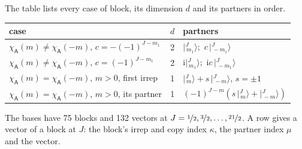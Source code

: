 \documentclass[10pt,a4paper]{article}
\numberwithin{equation}{section}
\newcommand{\grp}[1]{\mathsf{#1}}
\newcommand{\iunit}{\mathrm{i}}
\newcommand{\chiA}{\chi_{\grp{A}}}
\newcommand{\mult}{\kappa}
\newcommand{\intx}{\mu}
\newcommand{\jm}[2]{\bigl\lvert{}^{#1}_{\,#2}\bigr\rangle}
\begin{document}
\leavevmode\label{n:head.case}\label{n:head.partners}The table lists every case of block, its dimension $d$ and its partners in order.
\begin{center}\begin{tabular}{@{}lrl@{}}\toprule
case & $d$ & partners\\\midrule
$\chiA(m) \ne \chiA(-m)$, $c = -(-1)^{J-m_1}$ & 2 & $\jm{J}{m_1}$;\ $c\,\jm{J}{-m_1}$\\
$\chiA(m) \ne \chiA(-m)$, $c = (-1)^{J-m_1}$ & 2 & $\iunit\jm{J}{m_1}$;\ $\iunit c\,\jm{J}{-m_1}$\\
$\chiA(m) = \chiA(-m)$, $m > 0$, first irrep & 1 & $\jm{J}{m} + s\,\jm{J}{-m}$, $s = \pm1$\\
$\chiA(m) = \chiA(-m)$, $m > 0$, its partner & 1 & $(-1)^{J-m}(s\,\jm{J}{m} + \jm{J}{-m})$\\
\bottomrule\end{tabular}\end{center}
The bases have 75 blocks and 132 vectors at $J = \nicefrac{1}{2}, \nicefrac{3}{2}, \dots, \nicefrac{21}{2}$. \label{n:head.vector}A row gives a vector of a block at $J$: the block's irrep and copy index $\mult$, the partner index $\intx$ and the vector.
\end{document}
